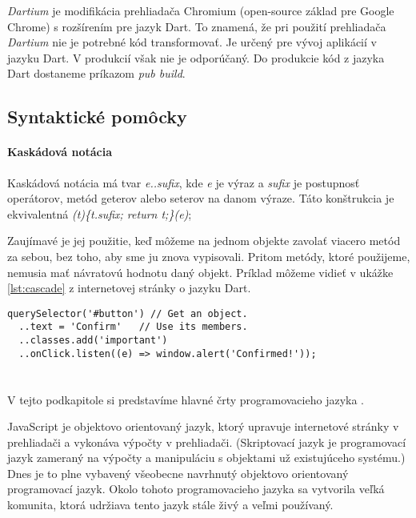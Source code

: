 \emph{Dartium} je modifikácia prehliadača Chromium (open-source základ pre Google Chrome) s rozšírením pre jazyk Dart. To znamená, že pri použití prehliadača \emph{Dartium} nie je potrebné kód transformovať. Je určený pre vývoj aplikácií v jazyku Dart. V produkcií však nie je odporúčaný. Do produkcie kód z jazyka Dart dostaneme príkazom \emph{pub build}.%

\subsection{Syntaktické pomôcky}

\paragraph{Kaskádová notácia}
Kaskádová notácia má tvar \emph{e..sufix}, kde \emph{e} je výraz a \emph{sufix} je postupnosť operátorov, metód geterov alebo seterov na danom výraze. Táto konštrukcia je ekvivalentná \emph{(t)\{t.sufix; return t;\}(e)};

Zaujímavé je jej použitie, keď môžeme na jednom objekte zavolať viacero metód za sebou, bez toho, aby sme ju znova vypisovali. Pritom metódy, ktoré použijeme, nemusia mať návratovú hodnotu daný objekt. Príklad môžeme vidieť v ukážke \ref{lst:cascade} z internetovej stránky o jazyku Dart\cite{dartLanguageTour}.

\begin{lstlisting}[caption=Kaskádová notácia, label={lst:cascade}]
querySelector('#button') // Get an object.
  ..text = 'Confirm'   // Use its members.
  ..classes.add('important')
  ..onClick.listen((e) => window.alert('Confirmed!'));
\end{lstlisting}







\section{\JS{}}
\label{sec:JS}
V tejto podkapitole si predstavíme hlavné črty programovacieho jazyka \JS{}. 

JavaScript je objektovo orientovaný jazyk, ktorý upravuje internetové stránky v prehliadači a vykonáva výpočty v prehliadači.
(Skriptovací jazyk je programovací jazyk zameraný na výpočty a manipuláciu s objektami už existujúceho systému.)
Dnes je to plne vybavený všeobecne navrhnutý objektovo orientovaný programovací jazyk.
Okolo tohoto programovacieho jazyka sa vytvorila veľká komunita, ktorá udržiava tento jazyk stále živý a veľmi používaný.

